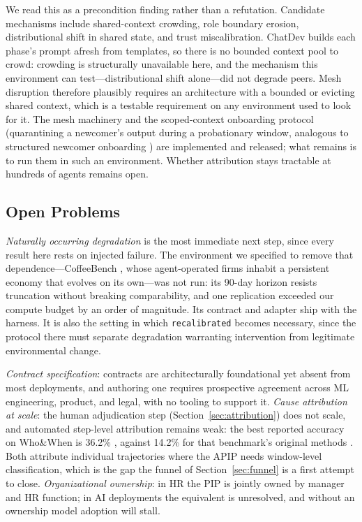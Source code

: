 \documentclass[conference]{IEEEtran}
\newcommand{\code}[1]{\texttt{\small #1}}
\begin{document}
We read this as a precondition finding rather than a refutation. Candidate
mechanisms include shared-context crowding, role boundary erosion,
distributional shift in shared state, and trust miscalibration. ChatDev builds
each phase's prompt afresh from templates, so there is no bounded context pool
to crowd: crowding is structurally unavailable here, and the mechanism this
environment can test---distributional shift alone---did not degrade peers. Mesh
disruption therefore plausibly requires an architecture with a bounded or
evicting shared context, which is a testable requirement on any environment
used to look for it. The mesh machinery and the scoped-context onboarding
protocol (quarantining a newcomer's output during a probationary window,
analogous to structured newcomer onboarding \cite{kammeyer2013}) are
implemented and released; what remains is to run them in such an environment.
Whether attribution stays tractable at hundreds of agents remains open.

\subsection{Open Problems}
\label{sec:open}

\emph{Naturally occurring degradation} is the most immediate next step, since
every result here rests on injected failure. The environment we specified to
remove that dependence---CoffeeBench \cite{coffeebench2026}, whose
agent-operated firms inhabit a persistent economy that evolves on its own---was
not run: its 90-day horizon resists truncation without breaking comparability,
and one replication exceeded our compute budget by an order of magnitude. Its
contract and adapter ship with the harness. It is also the setting in which
\code{recalibrated} becomes necessary, since the protocol there must separate
degradation warranting intervention from legitimate environmental change.

\emph{Contract specification}: contracts
are architecturally foundational yet absent from most deployments, and
authoring one requires prospective agreement across ML engineering, product,
and legal, with no tooling to support it. \emph{Cause attribution at scale}:
the human adjudication step (Section~\ref{sec:attribution}) does not scale, and
automated step-level attribution remains weak: the best reported accuracy on
Who\&When is 36.2\% \cite{ma2025attribution}, against 14.2\% for that
benchmark's original methods \cite{zhang2025}. Both attribute individual
trajectories where the APIP needs window-level classification, which is the gap
the funnel of Section~\ref{sec:funnel} is a first attempt to close.
\emph{Organizational ownership}: in HR the PIP is jointly owned by manager and
HR function; in AI deployments the equivalent is unresolved, and without an
ownership model adoption will stall.
\end{document}
